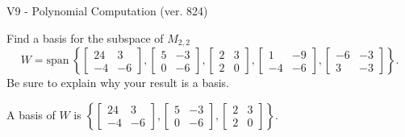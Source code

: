 \begin{exercise}
  \begin{exerciseTitle}V9 - Polynomial Computation (ver. 824)\end{exerciseTitle}
  \begin{exerciseStatement}
    Find a basis for the subspace of \(M_{2,2}\) 
\[W=\mathrm{span}\ \left\{\left[\begin{array}{cc}
24 & 3 \\
-4 & -6
\end{array}\right] , \left[\begin{array}{cc}
5 & -3 \\
0 & -6
\end{array}\right] , \left[\begin{array}{cc}
2 & 3 \\
2 & 0
\end{array}\right] , \left[\begin{array}{cc}
1 & -9 \\
-4 & -6
\end{array}\right] , \left[\begin{array}{cc}
-6 & -3 \\
3 & -3
\end{array}\right]\right\}.\]
 Be sure to explain why your result is a basis.


  \end{exerciseStatement}
  \begin{exerciseAnswer}
   A basis of \(W\) is  \(\left\{\left[\begin{array}{cc}
24 & 3 \\
-4 & -6
\end{array}\right] , \left[\begin{array}{cc}
5 & -3 \\
0 & -6
\end{array}\right] , \left[\begin{array}{cc}
2 & 3 \\
2 & 0
\end{array}\right]\right\}\).
  


  \end{exerciseAnswer}
\end{exercise}